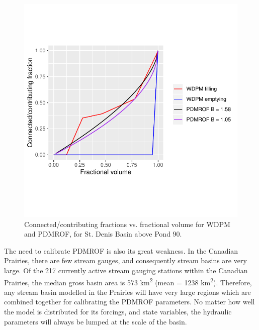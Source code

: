 \documentclass[draft,linenumbers]{agujournal2018}
\begin{document}
\begin{figure}[h]
\includegraphics[width=1\linewidth,]{figures/SD_above_90_WDPM_PDMROF} \caption{Connected/contributing fractions vs. fractional volume for WDPM and PDMROF, for St. Denis Basin above Pond 90.}\label{fig:unnamed-chunk-2}
\end{figure}

The need to calibrate PDMROF is also its great weakness. In the Canadian
Prairies, there are few stream gauges, and consequently stream basins
are very large. Of the 217 currently active stream gauging stations
within the Canadian Prairies, the median gross basin area is 573
km\textsuperscript{2} (mean = 1238 km\textsuperscript{2}). Therefore,
any stream basin modelled in the Prairies will have very large regions
which are combined together for calibrating the PDMROF parameters. No
matter how well the model is distributed for its forcings, and state
variables, the hydraulic parameters will always be lumped at the scale
of the basin.
\end{document}
